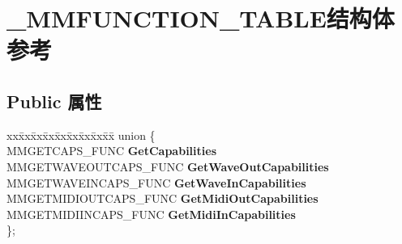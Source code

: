 \hypertarget{struct___m_m_f_u_n_c_t_i_o_n___t_a_b_l_e}{}\section{\+\_\+\+M\+M\+F\+U\+N\+C\+T\+I\+O\+N\+\_\+\+T\+A\+B\+L\+E结构体 参考}
\label{struct___m_m_f_u_n_c_t_i_o_n___t_a_b_l_e}
\subsection*{Public 属性}
\begin{DoxyCompactItemize}
\item 
\mbox{\label{struct___m_m_f_u_n_c_t_i_o_n___t_a_b_l_e_aaabfb863a1e30774dd16b9409dabffa6}} 
\begin{tabbing}
xx\=xx\=xx\=xx\=xx\=xx\=xx\=xx\=xx\=\kill
union \{\\
\>MMGETCAPS\_FUNC {\bfseries GetCapabilities}\\
\>MMGETWAVEOUTCAPS\_FUNC {\bfseries GetWaveOutCapabilities}\\
\>MMGETWAVEINCAPS\_FUNC {\bfseries GetWaveInCapabilities}\\
\>MMGETMIDIOUTCAPS\_FUNC {\bfseries GetMidiOutCapabilities}\\
\>MMGETMIDIINCAPS\_FUNC {\bfseries GetMidiInCapabilities}\\
\}; \\


\end{tabbing}
\end{DoxyCompactItemize}
